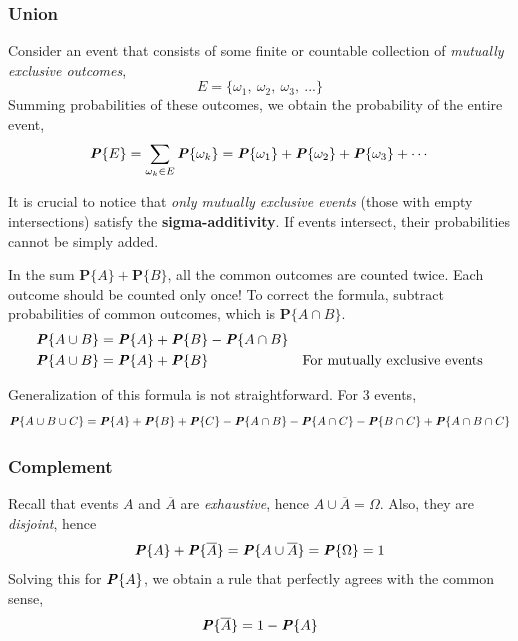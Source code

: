 \documentclass{article}
\begin{document}
\subsubsection{Union}

Consider an event that consists of some finite or countable collection of \textit{mutually exclusive outcomes},
\begin{equation*}
    E = \{\omega_1,\ \omega_2,\ \omega_3,\ ...\}
\end{equation*}
Summing probabilities of these outcomes, we obtain the probability of the entire event,
\begin{equation*}
    \textbf{\textit{P}}\{E\} = \sum_{\omega_k \in E} \textbf{\textit{P}}\{\omega_k\} = \textbf{\textit{P}}\{\omega_1\} + \textbf{\textit{P}}\{\omega_2\} + \textbf{\textit{P}}\{\omega_3\} + \cdots
\end{equation*}

It is crucial to notice that \textit{only mutually exclusive events} (those with empty intersections) satisfy the \textbf{sigma-additivity}. If events intersect, their probabilities cannot be simply added.

In the sum $\mathbf{P}\{A\} + \mathbf{P}\{B\}$, all the common outcomes are counted twice. Each outcome should be counted only once! To correct the formula, subtract probabilities of common outcomes, which is $\mathbf{P}\{A \cap B\}$.
\begin{align*}
    \textbf{\textit{P}}\{A \cup B\} &= \textbf{\textit{P}}\{A\} + \textbf{\textit{P}}\{B\} - \textbf{\textit{P}}\{A \cap B\}\\
    \textbf{\textit{P}}\{A \cup B\} &= \textbf{\textit{P}}\{A\} + \textbf{\textit{P}}\{B\} &\text{For mutually exclusive events}
\end{align*}

Generalization of this formula is not straightforward. For 3 events,
\begin{align*}
    \textbf{\textit{P}}\{A \cup B \cup C\} = \textbf{\textit{P}}\{A\} + \textbf{\textit{P}}\{B\} + \textbf{\textit{P}}\{C\} - \textbf{\textit{P}}\{A \cap B\} - \textbf{\textit{P}}\{A \cap C\} - \textbf{\textit{P}}\{B \cap C\} + \textbf{\textit{P}}\{A \cap B \cap C\}
\end{align*}

\subsubsection{Complement}

Recall that events $A$ and $\overline{A}$ are \textit{exhaustive}, hence $A \cup \overline{A} = \Omega$. Also, they are \textit{disjoint}, hence
\begin{equation*}
    \textbf{\textit{P}}\{A\} + \textbf{\textit{P}}\{\overline{A}\} = \textbf{\textit{P}}\{A \cup \overline{A}\} = \textbf{\textit{P}}\{\Omega\} = 1
\end{equation*}
Solving this for $\textbf{\textit{P}}\{A\}$, we obtain a rule that perfectly agrees with the common sense,
\begin{equation*}
    \textbf{\textit{P}}\{\overline{A}\} = 1 - \textbf{\textit{P}}\{A\}
\end{equation*}
\end{document}
